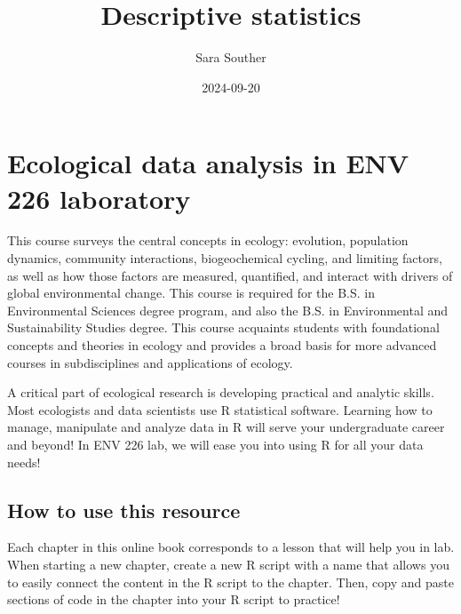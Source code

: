\documentclass[
]{book}
\title{Descriptive statistics}
\author{Sara Souther}
\date{2024-09-20}
\newenvironment{Shaded}{\begin{snugshade}}{\end{snugshade}}
\newcommand{\AttributeTok}[1]{\textcolor[rgb]{0.13,0.29,0.53}{#1}}
\newcommand{\ConstantTok}[1]{\textcolor[rgb]{0.56,0.35,0.01}{#1}}
\newcommand{\FunctionTok}[1]{\textcolor[rgb]{0.13,0.29,0.53}{\textbf{#1}}}
\newcommand{\NormalTok}[1]{#1}
\newcommand{\SpecialCharTok}[1]{\textcolor[rgb]{0.81,0.36,0.00}{\textbf{#1}}}
\begin{document}
\maketitle

{
\setcounter{tocdepth}{1}
\tableofcontents
}
\hypertarget{ecological-data-analysis-in-env-226-laboratory}{%
\chapter{Ecological data analysis in ENV 226 laboratory}\label{ecological-data-analysis-in-env-226-laboratory}}

This course surveys the central concepts in ecology: evolution, population dynamics, community interactions, biogeochemical cycling, and limiting factors, as well as how those factors are measured, quantified, and interact with drivers of global environmental change. This course is required for the B.S. in Environmental Sciences degree program, and also the B.S. in Environmental and Sustainability Studies degree. This course acquaints students with foundational concepts and theories in ecology and provides a broad basis for more advanced courses in subdisciplines and applications of ecology.

A critical part of ecological research is developing practical and analytic skills. Most ecologists and data scientists use R statistical software. Learning how to manage, manipulate and analyze data in R will serve your undergraduate career and beyond! In ENV 226 lab, we will ease you into using R for all your data needs!

\hypertarget{how-to-use-this-resource}{%
\section{How to use this resource}\label{how-to-use-this-resource}}

Each chapter in this online book corresponds to a lesson that will help you in lab. When starting a new chapter, create a new R script with a name that allows you to easily connect the content in the R script to the chapter. Then, copy and paste sections of code in the chapter into your R script to practice!

\begin{Shaded}
\end{Shaded}
\end{document}
